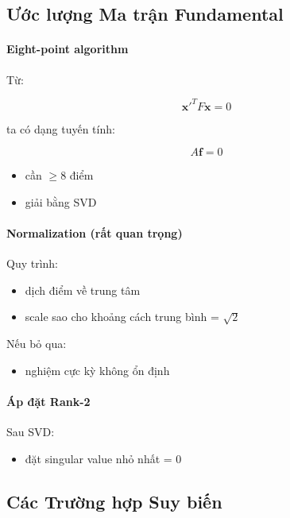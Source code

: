 \subsection{Ước lượng Ma trận Fundamental}
\label{subsec:F_estimation}

\paragraph{Eight-point algorithm}

Từ:

\[
\mathbf{x}'^T F \mathbf{x} = 0
\]

ta có dạng tuyến tính:

\[
A \mathbf{f} = 0
\]

\begin{itemize}
	\item cần $\geq 8$ điểm
	\item giải bằng SVD
\end{itemize}

\paragraph{Normalization (rất quan trọng)}

Quy trình:
\begin{itemize}
	\item dịch điểm về trung tâm
	\item scale sao cho khoảng cách trung bình = $\sqrt{2}$
\end{itemize}

Nếu bỏ qua:
\begin{itemize}
	\item nghiệm cực kỳ không ổn định
\end{itemize}

\paragraph{Áp đặt Rank-2}

Sau SVD:

\begin{itemize}
	\item đặt singular value nhỏ nhất = 0
\end{itemize}

\subsection{Các Trường hợp Suy biến}
\label{subsec:degenerate_cases}

